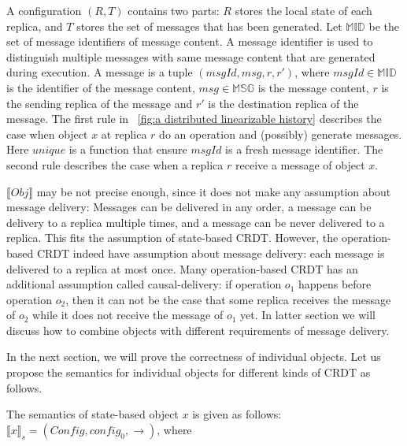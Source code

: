 A configuration $(R,T)$ contains two parts: $R$ stores the local state of each replica, and $T$ stores the set of messages that has been generated. Let $\mathbb{MID}$ be the set of message identifiers of message content. A message identifier is used to distinguish multiple messages with same message content that are generated during execution. A message is a tuple $(\mathit{msgId},\mathit{msg},r,r')$, where $\mathit{msgId} \in \mathbb{MID}$ is the identifier of the message content, $\mathit{msg} \in \mathbb{MSG}$ is the message content, $r$ is the sending replica of the message and $r'$ is the destination replica of the message. The first rule in \figurename~\ref{fig:a distributed linearizable history} describes the case when object $x$ at replica $r$ do an operation and (possibly) generate messages. Here $\mathit{unique}$ is a function that ensure $\mathit{msgId}$ is a fresh message identifier. The second rule describes the case when a replica $r$ receive a message of object $x$.

$\llbracket \mathit{Obj} \rrbracket$ may be not precise enough, since it does not make any assumption about message delivery: Messages can be delivered in any order, a message can be delivery to a replica multiple times, and a message can be never delivered to a replica. This fits the assumption of state-based CRDT. However, the operation-based CRDT indeed have assumption about message delivery: each message is delivered to a replica at most once. Many operation-based CRDT has an additional assumption called causal-delivery: if operation $o_1$ happens before operation $o_2$, then it can not be the case that some replica receives the message of $o_2$ while it does not receive the message of $o_1$ yet. In latter section we will discuss how to combine objects with different requirements of message delivery. 

In the next section, we will prove the correctness of individual objects. Let us propose the semantics for individual objects for different kinds of CRDT as follows.

The semantics of state-based object $x$ is given as follows: $\llbracket x \rrbracket_{s} = (\mathit{Config},\mathit{config}_0,\rightarrow)$, where

